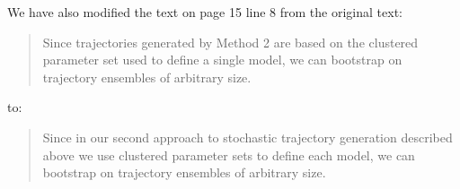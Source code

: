 \documentclass{article}
\begin{document}
\begin{enumerate}[label={Comment \theenumi :}, leftmargin=3.9\parindent]
    We have also modified the text on page 15 line 8 from the original text:
    \begin{quote}
    Since trajectories generated by Method 2 are based on the clustered parameter set used to define a
    single model, we can bootstrap on trajectory ensembles of arbitrary size.
    \end{quote}
    to:
    \begin{quote}
    Since in our second approach to stochastic trajectory generation described above we use clustered 
    parameter sets to define each model, we can bootstrap on trajectory ensembles of arbitrary size.
    \end{quote}

\end{enumerate}



\end{document}
